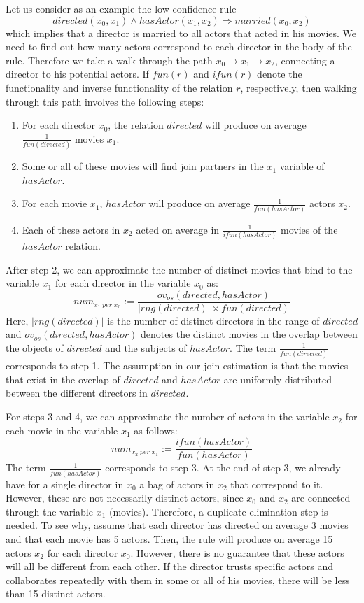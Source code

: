 {Let us consider as an example the low confidence rule
\[
 directed(x_0,x_1) \wedge hasActor(x_1,x_2) \Rightarrow married(x_0,x_2)
\]
which implies that a director is married to all actors that acted in his movies.
We need to find out how many actors correspond to each director in the body of the rule.
Therefore we take a walk through the path $x_0 \rightarrow x_1 \rightarrow x_2$, connecting a director to his potential actors. If $fun(r)$ and $ifun(r)$
denote the functionality and inverse functionality of the relation $r$, respectively, then
walking through this path involves the following steps:
\begin{enumerate} \itemsep +0.3ex
 \item For each director $x_0$, the relation $directed$ will produce on average $\frac{1}{fun(directed)}$ movies $x_1$.
 \item Some or all of these movies will find join partners in the $x_1$ variable  of $hasActor$.
 \item For each movie $x_1$, $hasActor$ will produce on average $\frac{1}{fun(hasActor)}$ actors $x_2$.
 \item Each of these actors in $x_2$ acted on average in  $\frac{1}{ifun(hasActor)}$ movies of the $hasActor$ relation.
\end{enumerate}
After step 2, we can approximate the number of distinct movies that bind to the variable $x_1$ for each director in the variable $x_0$ as:
$$
 num_{x_1 \; per \; x_0} := \frac{ov_{os}(directed,hasActor)}{|rng(directed)| \times fun(directed)}
$$
Here, $|rng(directed)|$ is the number of distinct directors in the range of $directed$ and $ov_{os}(directed,hasActor)$ denotes the distinct movies in the overlap between the objects of $directed$ and the subjects of $hasActor$.
The term $\frac{1}{fun(directed)}$ corresponds to step  1.
The assumption in our join estimation is that the movies that exist in the overlap of $directed$  and $hasActor$ are uniformly distributed between the different directors in $directed$.

For steps 3 and 4, we can approximate the number of actors in the variable $x_2$ for each movie in the variable $x_1$ as follows:
$$
 num_{x_2 \; per \; x_1} := \frac{ifun(hasActor)}{fun(hasActor)}
$$
The term $\frac{1}{fun(hasActor)}$ corresponds to step 3. At the end of step 3, we already have for a single director in $x_0$ a bag of actors in $x_2$ that correspond to it.
However, these are not necessarily distinct actors, since $x_0$ and $x_2$ are connected through the variable $x_1$ (movies). Therefore, a duplicate elimination step is needed.
To see why, assume that each director has directed on average 3 movies and that each movie has 5 actors. Then, the rule will produce on average 15 actors $x_2$ for each director $x_0$.
However, there is no guarantee that these actors will all be different from each other.
If the director trusts specific actors and collaborates repeatedly with them in some or all of his movies, there will be less than 15 distinct actors.

}

